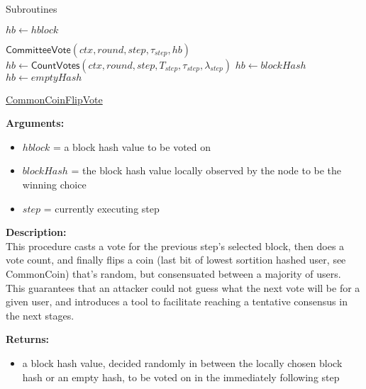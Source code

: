 \documentclass[10pt,a4paper]{article}
\begin{document}
\begin{section}{Subroutines}

\begin{algorithm}[H]
    \begin{algorithmic}[H]
        \State $hb \gets hblock$
    
        \State $\mathsf{CommitteeVote}(ctx, round, step, \tau_{step}, hb)$
        \State $hb \gets \mathsf{CountVotes}(ctx,round,step,T_{step},\tau_{step},\lambda_{step})$
                \State $hb \gets blockHash$
            \Else
                \State $hb \gets emptyHash$
            \EndIf
        \EndIf
    \EndFunction
    \end{algorithmic}
    \caption{\underline{CommonCoinFlipVote}}
\end{algorithm}

\noindent \textbf{Arguments:}
\begin{itemize}
    \item $hblock$ = a block hash value to be voted on
    \item $blockHash$ = the block hash value locally observed by the node to be the winning choice
    \item $step$ = currently executing step
  \end{itemize}

\noindent \textbf{Description:}\\
This procedure casts a vote for the previous step's selected block, then does a vote count,
and finally flips a coin (last bit of lowest sortition hashed user, see CommonCoin) that's random,
but consensuated between a majority of users. This guarantees that an attacker could not guess what the
next vote will be for a given user, and introduces a tool to facilitate reaching a tentative consensus in the next stages.

\noindent \textbf{Returns:}
\begin{itemize}
    \item a block hash value, decided randomly in between the locally chosen block hash or an empty hash, to be voted on
    in the immediately following step
  \end{itemize}



\end{section}
\end{document}
